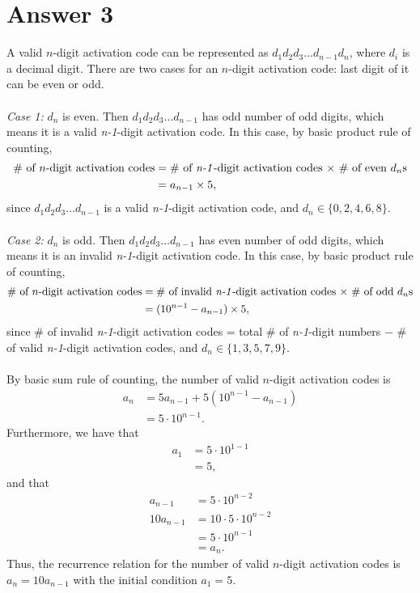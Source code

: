 \documentclass[11pt]{article}
\begin{document}
\section*{Answer 3}
A valid $n$-digit activation code can be represented as $d_1 d_2 d_3 \dots d_{n - 1} d_n$, where $d_i$ is a decimal digit. There are two cases for an $n$-digit activation code: last digit of it can be even or odd. \\ \\
\textit{Case 1:} $d_n$ is even. Then $d_1 d_2 d_3 \dots d_{n - 1}$ has odd number of odd digits, which means it is a valid \textit{n-1}-digit activation code. In this case, by basic product rule of counting,
\begin{align*}
    \text{$\#$ of $n$-digit activation codes} &= \text{$\#$ of \textit{n-1}-digit activation codes $\times$ $\#$ of even $d_n$s} \\
    &= a_{n - 1} \times 5,
\end{align*}
since $d_1 d_2 d_3 \dots d_{n - 1}$ is a valid \textit{n-1}-digit activation code, and $d_n \in \{0, 2, 4, 6, 8\}$. \\ \\
\textit{Case 2:} $d_n$ is odd. Then $d_1 d_2 d_3 \dots d_{n - 1}$ has even number of odd digits, which means it is an invalid \textit{n-1}-digit activation code. In this case, by basic product rule of counting,
\begin{align*}
    \text{$\#$ of $n$-digit activation codes} &= \text{$\#$ of invalid \textit{n-1}-digit activation codes $\times$ $\#$ of odd $d_n$s} \\
    &= (10^{n - 1} - a_{n - 1}) \times 5,
\end{align*}
since $\#$ of invalid \textit{n-1}-digit activation codes = total $\#$ of \textit{n-1}-digit numbers $-$ $\#$ of valid \textit{n-1}-digit activation codes, and $d_n \in \{1, 3, 5, 7, 9\}$. \\ \\
By basic sum rule of counting, the number of valid $n$-digit activation codes is
\begin{align*}
    a_n &= 5 a_{n - 1} + 5 (10^{n - 1} - a_{n - 1}) \\
    &= 5 \cdot 10^{n - 1}.
\end{align*}
Furthermore, we have that
\begin{align*}
    a_1 &= 5 \cdot 10^{1 - 1} \\
    &= 5,
\end{align*}
and that
\begin{align*}
    a_{n - 1} &= 5 \cdot 10^{n - 2} \\
    10 a_{n - 1} &= 10 \cdot 5 \cdot 10^{n - 2} \\
    &= 5 \cdot 10^{n - 1} \\
    &= a_n.
\end{align*}
Thus, the recurrence relation for the number of valid $n$-digit activation codes is $a_n = 10 a_{n - 1}$ with the initial condition $a_1 = 5$.
\end{document}

